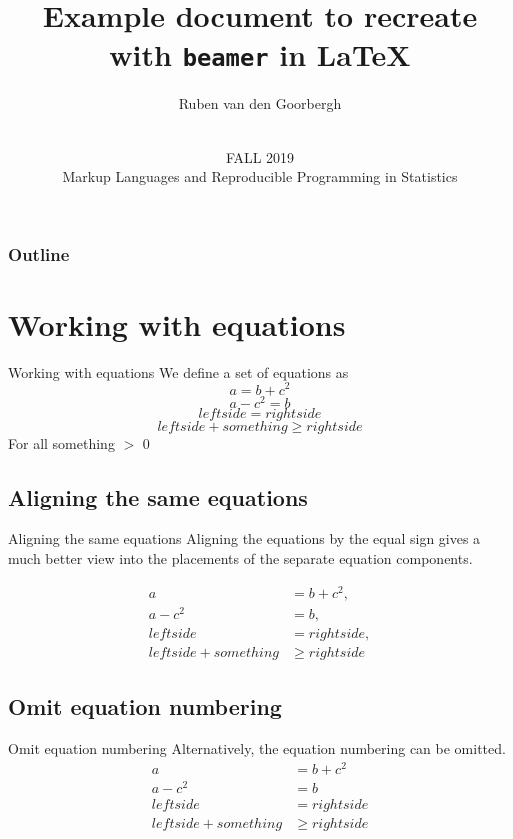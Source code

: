 \documentclass{beamer}
\title[Example] {Example document to recreate with \texttt{beamer} in \LaTeX}
\author[Ruben van den Goorbergh]
{
 Ruben van den Goorbergh
}
\date[MLRPS]
{\vspace{.5 in}\\ FALL 2019 \\ Markup Languages and Reproducible Programming in Statistics  \vskip6mm}
\begin{document}
\titlepage

\begin{frame}
\frametitle{Outline}
\tableofcontents
\end{frame}

\section{Working with equations}
\begin{frame}{Working with equations}
We define a set of equations as
\begin{equation}
    a = b + c^2
\end{equation}
\begin{equation}
    a - c^2 = b
\end{equation}
\begin{equation}
    left side = right side
\end{equation}
\begin{equation}
    left side + something \geq right side
\end{equation}    
For all something $>$ 0    
\end{frame}

\subsection{Aligning the same equations}
\begin{frame}{Aligning the same equations}
Aligning the equations by the equal sign gives a much better view into the placements of the separate equation components.

\begin{align}
    a &= b + c^2,\\
    a - c^2 &= b,\\
    left side &= right side,\\
    left side + something &\geq right side
\end{align}
    
\end{frame}

\subsection{Omit equation numbering}
\begin{frame}{Omit equation numbering}
Alternatively, the equation numbering can be omitted.
\begin{align*}
    a &= b + c^2\\
    a - c^2 &= b\\
    left side &= right side\\
    left side + something &\geq right side
\end{align*}

\end{frame}
\end{document}
